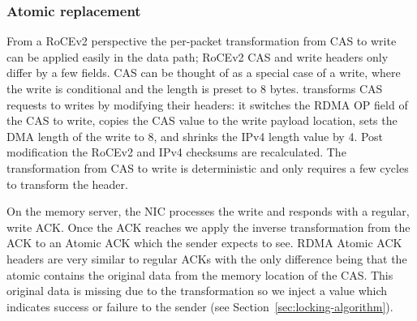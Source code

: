 \subsubsection{Atomic replacement} 

From a RoCEv2 perspective
the per-packet transformation from CAS to write can be applied easily
in the data path; RoCEv2 CAS and write headers only differ by a few
fields. CAS can be thought of as a special case of a write, where the
write is conditional and the length is preset to 8 bytes.
{\sword} transforms CAS requests to writes by modifying their headers: it
switches the RDMA OP field of the CAS to write, copies the CAS
value to the write payload location, sets the DMA length of the write
to 8, and shrinks the IPv4 length value by 4.  Post modification the RoCEv2
and IPv4 checksums are recalculated.
The transformation from CAS to write
is deterministic and only requires a few cycles to transform the
header.

On the memory server, the NIC processes the write and responds with a
regular, write ACK. Once the ACK reaches {\sword} we apply the
inverse transformation from the ACK to an Atomic ACK which the sender
expects to see.  RDMA Atomic ACK headers are very similar to regular
ACKs with the only difference being that the atomic contains the
original data from the memory location of the CAS. This original data
is missing due to the transformation so we inject a value which
indicates success or failure to the sender (see Section~\ref{sec:locking-algorithm}).





